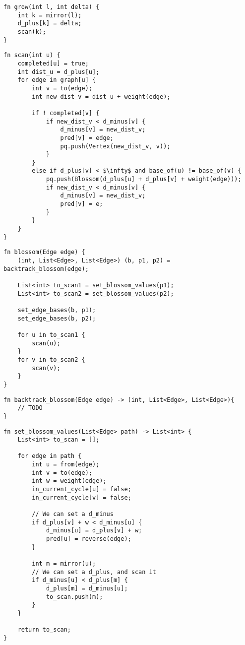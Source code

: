 \begin{lstlisting}[caption={Grow},label=Listing,mathescape=true]
fn grow(int l, int delta) {
    int k = mirror(l);
    d_plus[k] = delta;
    scan(k);
}
\end{lstlisting}

\begin{lstlisting}[caption={Scan},label=Listing,mathescape=true]
fn scan(int u) {
    completed[u] = true;
    int dist_u = d_plus[u];
    for edge in graph[u] {
        int v = to(edge);
        int new_dist_v = dist_u + weight(edge);

        if ! completed[v] {
            if new_dist_v < d_minus[v] {
                d_minus[v] = new_dist_v;
                pred[v] = edge;
                pq.push(Vertex(new_dist_v, v));
            }
        }
        else if d_plus[v] < $\infty$ and base_of(u) != base_of(v) {
            pq.push(Blossom(d_plus[u] + d_plus[v] + weight(edge)));
            if new_dist_v < d_minus[v] {
                d_minus[v] = new_dist_v;
                pred[v] = e;
            }
        }
    }
}

\end{lstlisting}

\begin{lstlisting}[caption={Blossom},label=Listing,mathescape=true]
fn blossom(Edge edge) {
    (int, List<Edge>, List<Edge>) (b, p1, p2) = backtrack_blossom(edge);

    List<int> to_scan1 = set_blossom_values(p1);
    List<int> to_scan2 = set_blossom_values(p2);

    set_edge_bases(b, p1);
    set_edge_bases(b, p2);

    for u in to_scan1 {
        scan(u);
    }
    for v in to_scan2 {
        scan(v);
    }
}
\end{lstlisting}

\begin{lstlisting}[caption={Backtrack blossom},label=Listing,mathescape=true]
fn backtrack_blossom(Edge edge) -> (int, List<Edge>, List<Edge>){
    // TODO
}
\end{lstlisting}


\begin{lstlisting}[caption={Set blossom values},label=Listing,mathescape=true]
fn set_blossom_values(List<Edge> path) -> List<int> {
    List<int> to_scan = [];

    for edge in path {
        int u = from(edge);
        int v = to(edge);
        int w = weight(edge);
        in_current_cycle[u] = false;
        in_current_cycle[v] = false;

        // We can set a d_minus
        if d_plus[v] + w < d_minus[u] {
            d_minus[u] = d_plus[v] + w;
            pred[u] = reverse(edge);
        }

        int m = mirror(u);
        // We can set a d_plus, and scan it
        if d_minus[u] < d_plus[m] {
            d_plus[m] = d_minus[u];
            to_scan.push(m);
        }
    }

    return to_scan;
}
\end{lstlisting}

